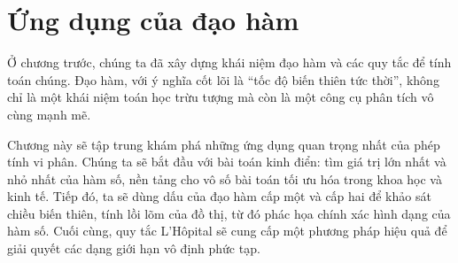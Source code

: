 \chapter{Ứng dụng của đạo hàm}
\label{chap:derivative-applications}

Ở chương trước, chúng ta đã xây dựng khái niệm đạo hàm và các quy tắc để tính toán chúng. Đạo hàm, với ý nghĩa cốt lõi là ``tốc độ biến thiên tức thời'', không chỉ là một khái niệm toán học trừu tượng mà còn là một công cụ phân tích vô cùng mạnh mẽ.

Chương này sẽ tập trung khám phá những ứng dụng quan trọng nhất của phép tính vi phân. Chúng ta sẽ bắt đầu với bài toán kinh điển: tìm giá trị lớn nhất và nhỏ nhất của hàm số, nền tảng cho vô số bài toán tối ưu hóa trong khoa học và kinh tế. Tiếp đó, ta sẽ dùng dấu của đạo hàm cấp một và cấp hai để khảo sát chiều biến thiên, tính lồi lõm của đồ thị, từ đó phác họa chính xác hình dạng của hàm số. Cuối cùng, quy tắc L'Hôpital sẽ cung cấp một phương pháp hiệu quả để giải quyết các dạng giới hạn vô định phức tạp.


